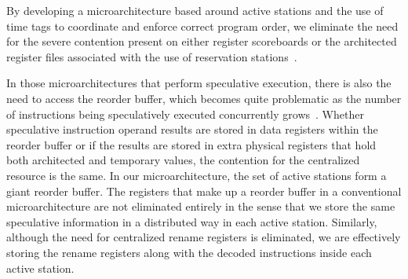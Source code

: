 \documentclass[10pt,twocolumn,dvips]{article}
\begin{document}
By developing a microarchitecture based around active stations
and the use of time tags to coordinate and enforce correct program
order, we eliminate the need for the severe contention present 
on either register scoreboards \cite{Thornton64} 
or the architected register files associated
with the use of reservation stations~\cite{Anderson67}.  

In those microarchitectures
that perform speculative execution, there is also
the need to access the reorder buffer, which becomes quite problematic
as the number of instructions being speculatively executed concurrently
grows~\cite{Palacharla}.  Whether speculative instruction operand
results are stored in data registers within the reorder buffer or if the
results are stored in extra physical registers that hold both architected
and temporary values, the contention for the centralized resource is
the same.  In our microarchitecture, the set of active
stations form a giant reorder buffer.  The registers that
make up a reorder buffer in a conventional microarchitecture are
not eliminated entirely in the sense that we store the same speculative
information in a distributed way in each active station.  Similarly,
although the need for centralized rename registers is eliminated,
we are effectively storing the rename registers along with the
decoded instructions inside each active station.  
\vspace{-0.2in}
\end{document}
